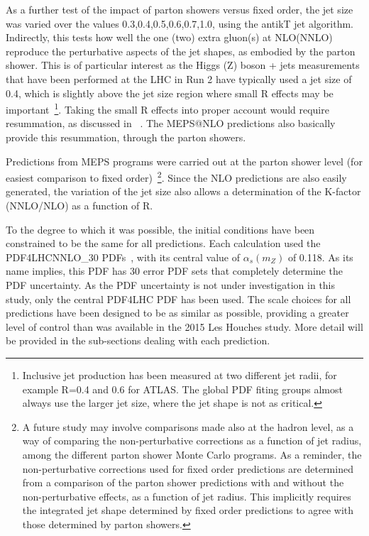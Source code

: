 \documentclass[aps,prd,onecolumn,fleqn,superscriptaddress,groupedaddress,nofootinbib,preprintnumbers,nobalancelastpage]{revtex4}
\begin{document}
As a  further test of the impact of parton showers versus fixed order, the jet
size was varied over the values 0.3,0.4,0.5,0.6,0.7,1.0, using the antikT jet
algorithm. Indirectly, this tests how well the one (two) extra gluon(s) at
NLO(NNLO) reproduce the perturbative aspects of the jet shapes, as embodied by
the parton shower. This is of particular interest as the Higgs (Z) boson + jets measurements that have been performed at the LHC in Run 2 have typically used a jet size of 0.4, which is 
slightly above the jet size region where small R effects may be important~\footnote{Inclusive jet production has been measured at two different jet radii, for example R=0.4 and 0.6 for ATLAS. The global PDF fiting groups almost always use the larger jet size, where the jet shape is not as critical.}. Taking the small R effects into proper account would require resummation, as discussed in ~\cite{}. The MEPS@NLO predictions also basically provide this resummation, through the parton showers. 

Predictions from MEPS programs were carried out
at the parton shower level (for easiest comparison to fixed order)~\footnote{A future study may involve comparisons  made also at the hadron level, as a way
of comparing the non-perturbative corrections as a function of jet radius, among the different parton shower Monte Carlo programs.  As a
reminder, the non-perturbative corrections used for fixed order predictions are
determined from a comparison of the parton shower predictions with and without
the non-perturbative effects, as a function of jet radius. This implicitly
requires the integrated jet shape determined by fixed order predictions to agree
with those determined by parton showers.}.
Since the NLO predictions are also easily generated, the variation of the jet
size also allows a determination of the K-factor (NNLO/NLO) as a function of R. 

To the degree to which it was possible, the initial conditions have been
constrained to be the same for all predictions. Each calculation used the
PDF4LHCNNLO\_30 PDFs~\cite{Butterworth:2015oua}, with its central value of
$\alpha_s(m_Z)$ of 0.118. As its name implies, this PDF has 30 error PDF sets
that completely determine the PDF uncertainty. As the PDF uncertainty is not under investigation in this study, only the
central PDF4LHC PDF has been used. The scale choices for all
predictions have been designed to be as similar as possible, 
providing a greater level of control than was available in the 2015 Les Houches
study. More detail will be
provided in the sub-sections dealing with each prediction. 
\end{document}
